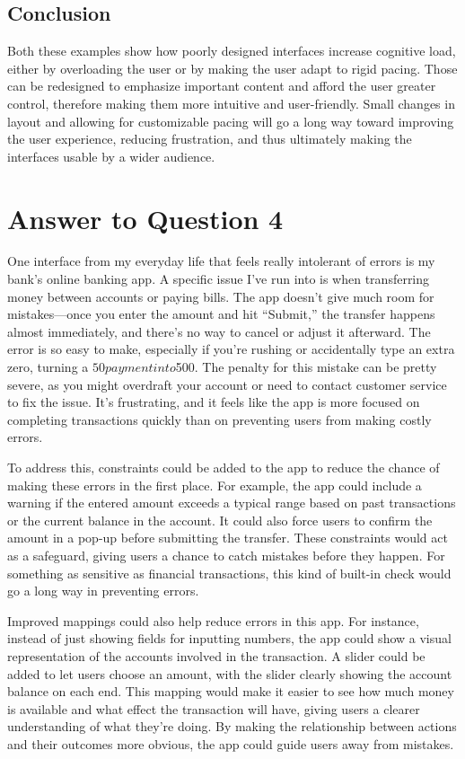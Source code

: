 \documentclass[
	letterpaper, %
]{jdf}
\begin{document}
\subsection{Conclusion}

Both these examples show how poorly designed interfaces increase cognitive load, either by overloading the user or by making the user adapt to rigid pacing. Those can be redesigned to emphasize important content and afford the user greater control, therefore making them more intuitive and user-friendly. Small changes in layout and allowing for customizable pacing will go a long way toward improving the user experience, reducing frustration, and thus ultimately making the interfaces usable by a wider audience.



\newpage

\section{Answer to Question 4}
One interface from my everyday life that feels really intolerant of errors is my bank's online banking app. A specific issue I’ve run into is when transferring money between accounts or paying bills. The app doesn’t give much room for mistakes—once you enter the amount and hit “Submit,” the transfer happens almost immediately, and there’s no way to cancel or adjust it afterward. The error is so easy to make, especially if you’re rushing or accidentally type an extra zero, turning a $50 payment into $500. The penalty for this mistake can be pretty severe, as you might overdraft your account or need to contact customer service to fix the issue. It’s frustrating, and it feels like the app is more focused on completing transactions quickly than on preventing users from making costly errors.

To address this, constraints could be added to the app to reduce the chance of making these errors in the first place. For example, the app could include a warning if the entered amount exceeds a typical range based on past transactions or the current balance in the account. It could also force users to confirm the amount in a pop-up before submitting the transfer. These constraints would act as a safeguard, giving users a chance to catch mistakes before they happen. For something as sensitive as financial transactions, this kind of built-in check would go a long way in preventing errors.

Improved mappings could also help reduce errors in this app. For instance, instead of just showing fields for inputting numbers, the app could show a visual representation of the accounts involved in the transaction. A slider could be added to let users choose an amount, with the slider clearly showing the account balance on each end. This mapping would make it easier to see how much money is available and what effect the transaction will have, giving users a clearer understanding of what they’re doing. By making the relationship between actions and their outcomes more obvious, the app could guide users away from mistakes.
\end{document}
